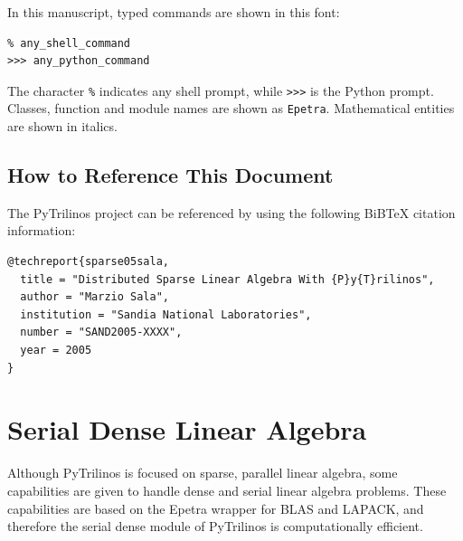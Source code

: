\documentclass[10pt,relax]{SANDreport}
\begin{document}
In this manuscript, typed commands are shown in this font:
\begin{verbatim}
% any_shell_command
>>> any_python_command
\end{verbatim}
The character \verb!%! indicates any shell prompt, while \verb!>>>! is the
Python prompt. Classes, function and module names are shown as \verb!Epetra!.
Mathematical entities are shown in italics.

\subsection{How to Reference This Document}
\label{sec:reference}

The PyTrilinos project can be referenced by using the following BiBTeX
citation information: 
\begin{verbatim}
@techreport{sparse05sala,
  title = "Distributed Sparse Linear Algebra With {P}y{T}rilinos",
  author = "Marzio Sala",
  institution = "Sandia National Laboratories",
  number = "SAND2005-XXXX",
  year = 2005
}
\end{verbatim}

\section{Serial Dense Linear Algebra}
\label{sec:serialdense}

Although PyTrilinos is focused on sparse, parallel linear algebra, some
capabilities are given to handle dense and serial linear algebra problems.
These capabilities are based on the Epetra wrapper for BLAS and LAPACK, and
therefore the serial dense module of PyTrilinos is computationally efficient.
\end{document}
